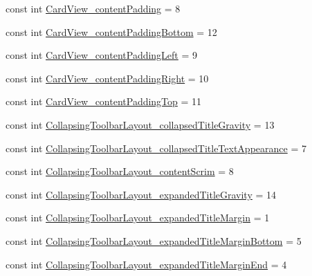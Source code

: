 \begin{DoxyCompactItemize}
\item 
const int \mbox{\hyperlink{class_f_w_p_s___app_1_1_droid_1_1_resource_1_1_styleable_a75cd5eeb6d673214f67dd572efb756f9}{Card\+View\+\_\+content\+Padding}} = 8
\item 
const int \mbox{\hyperlink{class_f_w_p_s___app_1_1_droid_1_1_resource_1_1_styleable_ade69ac4b0ead16680856ba3762a90793}{Card\+View\+\_\+content\+Padding\+Bottom}} = 12
\item 
const int \mbox{\hyperlink{class_f_w_p_s___app_1_1_droid_1_1_resource_1_1_styleable_a7a2c51bc0fb4bd2b72af99cad28d36d8}{Card\+View\+\_\+content\+Padding\+Left}} = 9
\item 
const int \mbox{\hyperlink{class_f_w_p_s___app_1_1_droid_1_1_resource_1_1_styleable_ad07980a0c3fc89e47690f12ffaebdd28}{Card\+View\+\_\+content\+Padding\+Right}} = 10
\item 
const int \mbox{\hyperlink{class_f_w_p_s___app_1_1_droid_1_1_resource_1_1_styleable_a19a3a0b15be1da698e3a75b88da982e8}{Card\+View\+\_\+content\+Padding\+Top}} = 11
\item 
const int \mbox{\hyperlink{class_f_w_p_s___app_1_1_droid_1_1_resource_1_1_styleable_aadd2f8e2d8f67030e0c2ecd67cba75c7}{Collapsing\+Toolbar\+Layout\+\_\+collapsed\+Title\+Gravity}} = 13
\item 
const int \mbox{\hyperlink{class_f_w_p_s___app_1_1_droid_1_1_resource_1_1_styleable_acdf27b46ae3f445f9795d8f7b72fab91}{Collapsing\+Toolbar\+Layout\+\_\+collapsed\+Title\+Text\+Appearance}} = 7
\item 
const int \mbox{\hyperlink{class_f_w_p_s___app_1_1_droid_1_1_resource_1_1_styleable_a1b8876bb899850fe55639dc82b7e15c0}{Collapsing\+Toolbar\+Layout\+\_\+content\+Scrim}} = 8
\item 
const int \mbox{\hyperlink{class_f_w_p_s___app_1_1_droid_1_1_resource_1_1_styleable_a75181540923d62ccac0a1dab5c9eae8d}{Collapsing\+Toolbar\+Layout\+\_\+expanded\+Title\+Gravity}} = 14
\item 
const int \mbox{\hyperlink{class_f_w_p_s___app_1_1_droid_1_1_resource_1_1_styleable_a3f3b543ba8ee6a8bda67017ef221e6c3}{Collapsing\+Toolbar\+Layout\+\_\+expanded\+Title\+Margin}} = 1
\item 
const int \mbox{\hyperlink{class_f_w_p_s___app_1_1_droid_1_1_resource_1_1_styleable_ab9f14689f967ebbadbf803e510b590b0}{Collapsing\+Toolbar\+Layout\+\_\+expanded\+Title\+Margin\+Bottom}} = 5
\item 
const int \mbox{\hyperlink{class_f_w_p_s___app_1_1_droid_1_1_resource_1_1_styleable_a3a05672c224134c791248c742f9f800f}{Collapsing\+Toolbar\+Layout\+\_\+expanded\+Title\+Margin\+End}} = 4

\end{DoxyCompactItemize}
